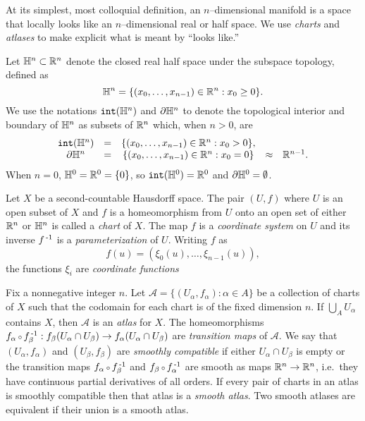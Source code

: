 At its simplest, most colloquial definition, an $n$--dimensional manifold is a space that locally looks like an $n$--dimensional real or half space.
We use \emph{charts} and \emph{atlases} to make explicit what is meant by ``looks like.''

\begin{defn}[Coordinates]
	\label{def:coordinates}
	Let $\mathbb{H}^n\subset\mathbb{R}^n$ denote the closed real half space under the subspace topology, defined as
	\[
		\mathbb{H}^n=\{(x_0,\dots,x_{n-1})\in\mathbb{R}^n : x_0\geq 0\}.
	\]
	We use the notations $\mathtt{int}(\mathbb{H}^n)$ and $\partial \mathbb{H}^n$ to denote the topological interior and boundary of $\mathbb{H}^n$ as subsets of $\mathbb{R}^n$ which, when $n>0$, are
	\[
		\begin{array}{ccccc}
			\mathtt{int}(\mathbb{H}^n) & = & \{(x_0,\dots,x_{n-1})\in\mathbb{R}^n : x_0 > 0\}, & &\\
			\partial \mathbb{H}^n	& = & \{(x_0,\dots,x_{n-1})\in\mathbb{R}^n : x_0 = 0\} & \approx & \mathbb{R}^{n-1}.
		\end{array}
	\]
	When $n=0$, $\mathbb{H}^0 = \mathbb{R}^0 = \{0\}$, so $\mathtt{int}(\mathbb{H}^0)=\mathbb{R}^0$ and $\partial\mathbb{H}^0=\emptyset$.

	Let $X$ be a second-countable Hausdorff space.
	The pair $(U,f)$ where $U$ is an open subset of $X$ and $f$ is a homeomorphism from $U$ onto an open set of either $\mathbb{R}^n$ or $\mathbb{H}^n$ is called a \emph{chart} of $X$.
	The map $f$ is a \emph{coordinate system} on $U$ and its inverse $f^{\,\text{-}1}$ is a \emph{parameterization} of $U$.
	Writing $f$ as
	\[
		f(u) = (\xi_0(u),\dots,\xi_{n-1}(u)),
	\]
	the functions $\xi_i$ are \emph{coordinate functions}
\end{defn}

\begin{defn}[Atlas]
	\label{def:atlas}
	Fix a nonnegative integer $n$.
	Let $\mathcal{A}=\{(U_\alpha,f_\alpha):\alpha\in A\}$ be a collection of charts of $X$ such that the codomain for each chart is of the fixed dimension $n$.
	If $\bigcup_A U_\alpha$ contains $X$, then $\mathcal{A}$ is an \emph{atlas} for $X$.
	The homeomorphisms $f_\alpha\comp f_\beta\inv:f_\beta(U_\alpha\cap U_\beta)\to f_\alpha(U_\alpha\cap U_\beta)$ are \emph{transition maps} of $\mathcal{A}$.
	We say that $(U_\alpha,f_\alpha)$ and $(U_\beta,f_\beta)$ are \emph{smoothly compatible} if either $U_\alpha\cap U_\beta$ is empty or the transition maps $f_\alpha\comp f_\beta\inv$ and $f_\beta\comp f_\alpha\inv$ are smooth as maps $\mathbb{R}^n\to\mathbb{R}^n$, i.e.\ they have continuous partial derivatives of all orders.
	If every pair of charts in an atlas is smoothly compatible then that atlas is a \emph{smooth atlas}.
	Two smooth atlases are equivalent if their union is a smooth atlas.
\end{defn}

